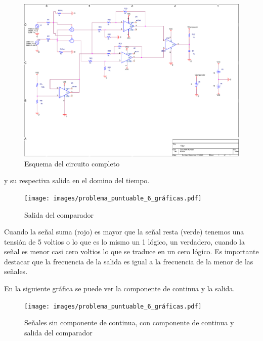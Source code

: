 {      \begin{figure}[H]
    \centering  
    \includegraphics[scale=0.6,page=1,clip, trim=1cm 5cm 1cm 0.45cm]{images/problema_puntuable_6_schee.pdf}
    \caption{Esquema del circuito completo}
  \end{figure}
  
    y su respectiva salida en el domino del tiempo.

       \begin{figure}[H]
    \centering  
    \texttt{[image: images/problema\_puntuable\_6\_gráficas.pdf]}
    \caption{Salida del comparador}
  \end{figure}
  
    
    Cuando la señal suma (rojo) es mayor que la señal resta (verde)
    tenemos una tensión de 5 voltios o lo que es lo mismo un 1 lógico,
    un verdadero, cuando la señal es menor casi cero voltios lo que se
    traduce en un cero lógico. Es importante destacar que la
    frecuencia de la salida es igual a la frecuencia de la menor de
    las señales.

    En la siguiente gráfica se puede ver la componente de continua y
    la salida.

          \begin{figure}[H]
    \centering  
    \texttt{[image: images/problema\_puntuable\_6\_gráficas.pdf]}
    \caption{Señales sin componente de continua, con componente de
      continua y salida del comparador}
  \end{figure}
  
}
